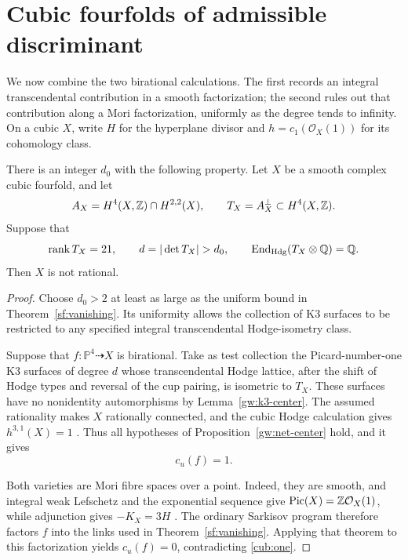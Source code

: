 \section{Cubic fourfolds of admissible discriminant}
\label{cub:section}

We now combine the two birational calculations.  The first records an
integral transcendental contribution in a smooth factorization; the second
rules out that contribution along a Mori factorization, uniformly as the
degree tends to infinity.
On a cubic $X$, write $H$ for the hyperplane divisor and
$h=c_1(\mathcal O_X(1))$ for its cohomology class.

\begin{proposition}
\label{cub:criterion}
There is an integer $d_0$ with the following property.  Let $X$ be a smooth
complex cubic fourfold, and let
\[
 A_X=H^4(X,\mathbb Z)\cap H^{2,2}(X),
 \qquad T_X=A_X^\perp\subset H^4(X,\mathbb Z).
\]
Suppose that
\[
 \operatorname{rank}T_X=21,\qquad
 d=|\det T_X|>d_0,\qquad
 \operatorname{End}_{\mathrm{Hdg}}(T_X\otimes\Q)=\Q.
\]
Then $X$ is not rational.
\end{proposition}

\begin{proof}
Choose $d_0>2$ at least as large as the uniform bound in
Theorem~\ref{sf:vanishing}.  Its uniformity allows the collection of K3
surfaces to be restricted to any specified integral transcendental
Hodge-isometry class.

Suppose that $f\colon\mathbb P^4\dashrightarrow X$ is birational.  Take as
test collection the Picard-number-one K3 surfaces of degree $d$ whose
transcendental Hodge lattice, after the shift of Hodge types and reversal
of the cup pairing, is isometric to $T_X$.  These surfaces have no
nonidentity automorphisms by Lemma~\ref{gw:k3-center}.
The assumed rationality makes $X$ rationally connected, and the cubic
Hodge calculation gives $h^{3,1}(X)=1$
\cite[Section~2.1]{Hassett00}. Thus all hypotheses of
Proposition~\ref{gw:net-center} hold, and it gives
\begin{equation}
 \label{cub:one}
 c_u(f)=1.
\end{equation}

Both varieties are Mori fibre spaces over a point.  Indeed, they are
smooth, and integral weak Lefschetz and the exponential sequence give
$\operatorname{Pic}(X)=\mathbb Z\mathcal O_X(1)$, while adjunction gives
$-K_X=3H$ \cite[Chapter~1, Section~1.1, Lemma~1.6 and
Corollary~1.9]{HuybrechtsCubic2023}.  The ordinary Sarkisov program therefore factors $f$ into the
links used in Theorem~\ref{sf:vanishing}.  Applying that theorem to this
factorization yields $c_u(f)=0$, contradicting \eqref{cub:one}.
\end{proof}

